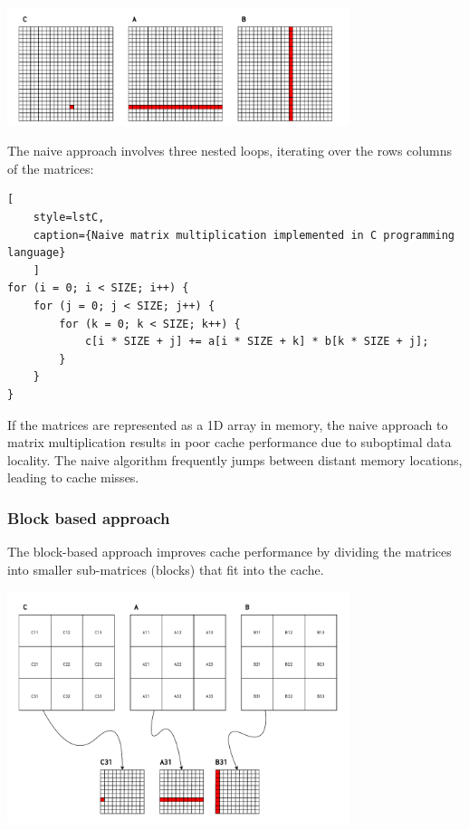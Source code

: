 \begin{center}
	\centering
	\includegraphics[width=0.75\textwidth]{figures/05-analysis/mm_naive.pdf}
	\label{fig:mm_naive}
\end{center}

The naive approach involves three nested loops, iterating over the rows columns of the matrices:

\begin{center}
\centering
\begin{minipage}{\linewidth}
\begin{lstlisting}[
	style=lstC,
    caption={Naive matrix multiplication implemented in C programming language}
    ]
for (i = 0; i < SIZE; i++) {
	for (j = 0; j < SIZE; j++) {
		for (k = 0; k < SIZE; k++) {
			c[i * SIZE + j] += a[i * SIZE + k] * b[k * SIZE + j];
		}
	}
}
\end{lstlisting}
\end{minipage}
\end{center}

\noindent If the matrices are represented as a 1D array in memory, the naive approach to matrix multiplication results in poor cache performance due to suboptimal data locality.
The naive algorithm frequently jumps between distant memory locations, leading to cache misses.

\subsubsection*{Block based approach}
The block-based approach improves cache performance by dividing the matrices into smaller sub-matrices (blocks) that fit into the cache.

\begin{center}
	\centering
	\includegraphics[width=0.75\textwidth]{figures/05-analysis/mm_block.pdf}
	\label{fig:mm_block}
\end{center}

